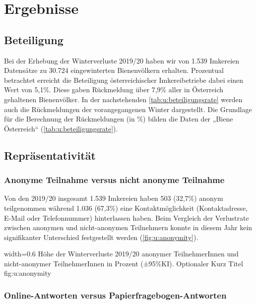 \section{Ergebnisse}
\subsection{Beteiligung}

Bei der Erhebung der Winterverluste 2019/20 haben wir von 1.539 Imkereien Datensätze zu 30.724 eingewinterten Bienenvölkern erhalten. Prozentual betrachtet erreicht die Beteiligung österreichischer Imkereibetriebe dabei einen Wert von 5,1\%. Diese gaben Rückmeldung über 7,9\% aller in Österreich gehaltenen Bienenvölker. In der nachstehenden \cref{tab:u:beteiligungsrate} werden auch die Rückmeldungen der vorangegangenen Winter dargestellt. Die Grundlage für die Berechnung der Rückmeldungen (in \%) bilden die Daten der „Biene Österreich`` (\cref{tab:u:beteiligungsrate}).



\subsection{Repräsentativität}
\subsubsection{Anonyme Teilnahme versus nicht anonyme Teilnahme}

Von den 2019/20 insgesamt 1.539 Imkereien haben 503 (32,7\%) anonym teilgenommen während 1.036 (67,3\%) eine Kontaktmöglichkeit (Kontaktadresse, E-Mail oder Telefonnummer) hinterlassen haben. Beim Vergleich der Verlustrate zwischen anonymen  und nicht-anonymen Teilnehmern  konnte in diesem Jahr kein signifikanter Unterschied festgestellt werden (\cref{fig:u:anonymity}).

  {width=0.6\textwidth} %
  {Höhe der Winterverluste 2019/20 anonymer TeilnehmerInnen und nicht-anonymer Teilnehmer\-Innen in Prozent (±95\%KI).} %
  {Optionaler Kurz Titel} %
  {fig:u:anonymity} %
  

\subsubsection{Online-Antworten versus Papierfragebogen-Antworten}

